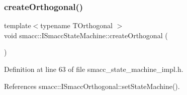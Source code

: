 \mbox{\label{classsmacc_1_1ISmaccStateMachine_a9155cf3d1877255d70b0bd71648734a3}} 
\subsubsection{\texorpdfstring{create\+Orthogonal()}{createOrthogonal()}}
{\footnotesize\ttfamily template$<$typename T\+Orthogonal $>$ \\
void smacc\+::\+I\+Smacc\+State\+Machine\+::create\+Orthogonal (\begin{DoxyParamCaption}{ }\end{DoxyParamCaption})\hspace{0.3cm}{\ttfamily [protected]}}



Definition at line 63 of file smacc\+\_\+state\+\_\+machine\+\_\+impl.\+h.



References smacc\+::\+I\+Smacc\+Orthogonal\+::set\+State\+Machine().


